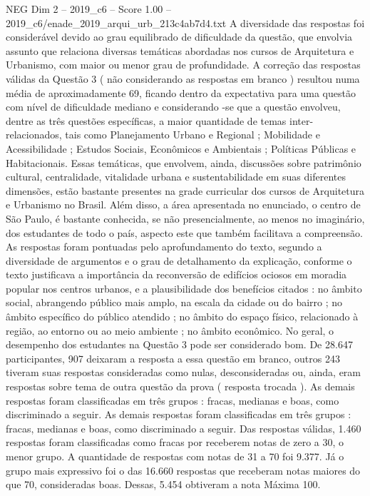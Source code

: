 \begin{textsample}{NEG Dim 2 – 2019\_c6 – Score 1.00 – 2019\_c6/enade\_2019\_arqui\_urb\_213c4ab7d4.txt}
A diversidade das respostas foi considerável devido ao grau equilibrado de dificuldade da questão, que envolvia assunto que relaciona diversas temáticas abordadas nos cursos de Arquitetura e Urbanismo, com maior ou menor grau de profundidade.
A correção das respostas válidas da Questão 3 ( não considerando as respostas em branco ) resultou numa média de aproximadamente 69, ficando dentro da expectativa para uma questão com nível de dificuldade mediano e considerando -se que a questão envolveu, dentre as três questões específicas, a maior quantidade de temas inter-relacionados, tais como Planejamento Urbano e Regional ; Mobilidade e Acessibilidade ; Estudos Sociais, Econômicos e Ambientais ; Políticas Públicas e Habitacionais.
Essas temáticas, que envolvem, ainda, discussões sobre patrimônio cultural, centralidade, vitalidade urbana e sustentabilidade em suas diferentes dimensões, estão bastante presentes na grade curricular dos cursos de Arquitetura e Urbanismo no Brasil.
Além disso, a área apresentada no enunciado, o centro de São Paulo, é bastante conhecida, se não presencialmente, ao menos no imaginário, dos estudantes de todo o país, aspecto este que também facilitava a compreensão.
As respostas foram pontuadas pelo aprofundamento do texto, segundo a diversidade de argumentos e o grau de detalhamento da explicação, conforme o texto justificava a importância da reconversão de edifícios ociosos em moradia popular nos centros urbanos, e a plausibilidade dos benefícios citados : no âmbito social, abrangendo público mais amplo, na escala da cidade ou do bairro ; no âmbito específico do público atendido ; no âmbito do espaço físico, relacionado à região, ao entorno ou ao meio ambiente ; no âmbito econômico.
No geral, o desempenho dos estudantes na Questão 3 pode ser considerado bom.
De 28.647 participantes, 907 deixaram a resposta a essa questão em branco, outros 243 tiveram suas respostas consideradas como nulas, desconsideradas ou, ainda, eram respostas sobre tema de outra questão da prova ( resposta trocada ).
As demais respostas foram classificadas em três grupos : fracas, medianas e boas, como discriminado a seguir.
As demais respostas foram classificadas em três grupos : fracas, medianas e boas, como discriminado a seguir.
Das respostas válidas, 1.460 respostas foram classificadas como fracas por receberem notas de zero a 30, o menor grupo.
A quantidade de respostas com notas de 31 a 70 foi 9.377.
Já o grupo mais expressivo foi o das 16.660 respostas que receberam notas maiores do que 70, consideradas boas.
Dessas, 5.454 obtiveram a nota Máxima 100.

\end{textsample}
